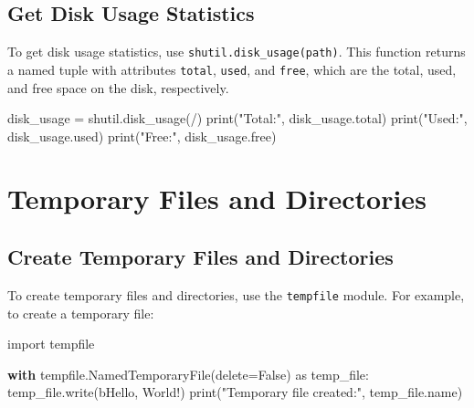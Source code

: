 \documentclass[
  letterpaper,
  DIV=11,
  numbers=noendperiod]{scrreprt}
\newenvironment{Shaded}{\begin{snugshade}}{\end{snugshade}}
\newcommand{\BuiltInTok}[1]{\textcolor[rgb]{0.00,0.23,0.31}{#1}}
\newcommand{\ControlFlowTok}[1]{\textcolor[rgb]{0.00,0.23,0.31}{\textbf{#1}}}
\newcommand{\ImportTok}[1]{\textcolor[rgb]{0.00,0.46,0.62}{#1}}
\newcommand{\NormalTok}[1]{\textcolor[rgb]{0.00,0.23,0.31}{#1}}
\newcommand{\OperatorTok}[1]{\textcolor[rgb]{0.37,0.37,0.37}{#1}}
\newcommand{\StringTok}[1]{\textcolor[rgb]{0.13,0.47,0.30}{#1}}
\newcommand{\VariableTok}[1]{\textcolor[rgb]{0.07,0.07,0.07}{#1}}
\begin{document}
\subsection{Get Disk Usage Statistics}\label{get-disk-usage-statistics}

To get disk usage statistics, use \texttt{shutil.disk\_usage(path)}.
This function returns a named tuple with attributes \texttt{total},
\texttt{used}, and \texttt{free}, which are the total, used, and free
space on the disk, respectively.

\begin{Shaded}
\begin{Highlighting}[]
\NormalTok{disk\_usage }\OperatorTok{=}\NormalTok{ shutil.disk\_usage(}\StringTok{\textquotesingle{}/\textquotesingle{}}\NormalTok{)}
\BuiltInTok{print}\NormalTok{(}\StringTok{"Total:"}\NormalTok{, disk\_usage.total)}
\BuiltInTok{print}\NormalTok{(}\StringTok{"Used:"}\NormalTok{, disk\_usage.used)}
\BuiltInTok{print}\NormalTok{(}\StringTok{"Free:"}\NormalTok{, disk\_usage.free)}
\end{Highlighting}
\end{Shaded}

\section{Temporary Files and
Directories}\label{temporary-files-and-directories}

\subsection{Create Temporary Files and
Directories}\label{create-temporary-files-and-directories}

To create temporary files and directories, use the \texttt{tempfile}
module. For example, to create a temporary file:

\begin{Shaded}
\begin{Highlighting}[]
\ImportTok{import}\NormalTok{ tempfile}

\ControlFlowTok{with}\NormalTok{ tempfile.NamedTemporaryFile(delete}\OperatorTok{=}\VariableTok{False}\NormalTok{) }\ImportTok{as}\NormalTok{ temp\_file:}
\NormalTok{    temp\_file.write(}\StringTok{b\textquotesingle{}Hello, World!\textquotesingle{}}\NormalTok{)}
    \BuiltInTok{print}\NormalTok{(}\StringTok{"Temporary file created:"}\NormalTok{, temp\_file.name)}
\end{Highlighting}
\end{Shaded}
\end{document}
